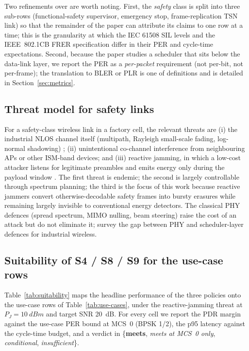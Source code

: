 \documentclass[journal,onecolumn,11pt,a4paper]{IEEEtran}
\begin{document}
Two refinements over \cite{Fan22} are worth noting. First, the
\emph{safety} class is split into three sub-rows (functional-safety
supervisor, emergency stop, frame-replication TSN link) so that the
remainder of the paper can attribute its claims to one row at a time;
this is the granularity at which the IEC 61508 SIL levels and the
IEEE~802.1CB FRER specification differ in their PER and cycle-time
expectations. Second, because the paper studies a scheduler that
sits below the data-link layer, we report the PER as a
\emph{per-packet} requirement (not per-bit, not per-frame); the
translation to BLER or PLR is one of definitions and is detailed in
Section~\ref{sec:metrics}.

\subsection{Threat model for safety links}
\label{sec:usecases-threat}

For a safety-class wireless link in a factory cell, the relevant
threats are (i) the industrial NLOS channel itself (multipath, Rayleigh
small-scale fading, log-normal shadowing) \cite{Mol09,Tan08,Tra18,Jae14};
(ii) unintentional co-channel interference from neighbouring APs or
other ISM-band devices; and (iii) reactive jamming, in which a
low-cost attacker listens for legitimate preambles and emits energy
only during the payload window \cite{Bay08,Bay13,Pel11,Gri21}. The
first threat is endemic; the second is largely controllable through
spectrum planning; the third is the focus of this work because
reactive jammers convert otherwise-decodable safety frames into
bursty erasures while remaining largely invisible to conventional
energy detectors. The classical PHY defences (spread spectrum, MIMO
nulling, beam steering) raise the cost of an attack but do not
eliminate it; \cite{Gri21,Ang22} survey the gap between PHY and
scheduler-layer defences for industrial wireless.

\subsection{Suitability of S4 / S8 / S9 for the use-case rows}
\label{sec:usecases-suitability}

Table~\ref{tab:suitability} maps the headline performance of the
three policies onto the use-case rows of
Table~\ref{tab:use-cases}, under the reactive-jamming threat at
$P_J = \SI{10}{dBm}$ and target SNR \SI{20}{dB}. For every cell we
report the PDR margin against the use-case PER bound at MCS~0
(BPSK 1/2), the p95 latency against the cycle-time budget, and a
verdict in \{\textbf{meets}, \emph{meets at MCS~0 only},
\emph{conditional}, \emph{insufficient}\}.
\end{document}
